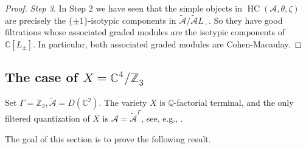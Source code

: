 \documentclass[12pt]{amsart}
\newcommand{\C}{\mathbb{C}}
\newcommand{\A}{\mathcal{A}}
\newcommand{\HC}{\operatorname{HC}}
\theoremstyle{definition}
\numberwithin{equation}{section}
\begin{document}
\begin{proof}

{\it Step 3}. In Step 2 we have seen that the simple objects in
$\HC(\A,\theta,\zeta)$ are precisely the $\{\pm 1\}$-isotypic components in $\tilde{\A}/\tilde{\A}L_-$.
So they have good filtrations whose associated graded modules are the isotypic components
of $\C[L_{\pm}]$. In particular, both associated graded modules are Cohen-Macaulay.
\end{proof}

\subsection{The case of $X=\C^4/\mathbb{Z}_3$}\label{SS_tau_check}
Set $\Gamma=\mathbb{Z}_3,\tilde{\A}=D(\C^2)$.
The variety $X$ is $\mathbb{Q}$-factorial terminal, and the only filtered quantization of $X$ is $\A=\tilde{\A}^\Gamma$, see, e.g., \cite[Section 3.6]{orbit}.

The goal of this section is to prove the following result.
\end{document}
